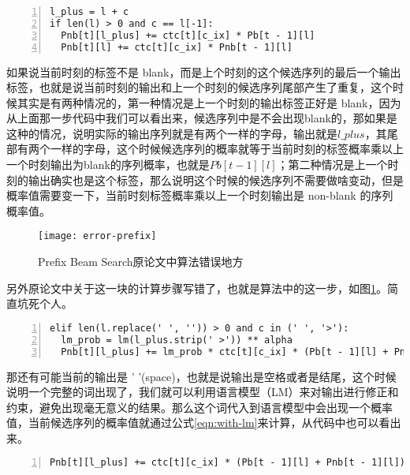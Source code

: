 \begin{lstlisting}[language = shell, numbers=left, 
         numberstyle=\tiny,keywordstyle=\color{blue!70},
         commentstyle=\color{red!50!green!50!blue!50},frame=shadowbox,
         rulesepcolor=\color{red!20!green!20!blue!20},basicstyle=\ttfamily]
l_plus = l + c
if len(l) > 0 and c == l[-1]:
  Pnb[t][l_plus] += ctc[t][c_ix] * Pb[t - 1][l]
  Pnb[t][l] += ctc[t][c_ix] * Pnb[t - 1][l]
\end{lstlisting}

如果说当前时刻的标签不是 blank，而是上个时刻的这个候选序列的最后一个输出标签，也就是说当前时刻的输出和上一个时刻的候选序列尾部产生了重复，这个时候其实是有两种情况的，第一种情况是上一个时刻的输出标签正好是 blank，因为从上面那一步代码中我们可以看出来，候选序列中是不会出现blank的，那如果是这种的情况，说明实际的输出序列就是有两个一样的字母，输出就是$l\_plus$，其尾部有两个一样的字母，这个时候候选序列的概率就等于当前时刻的标签概率乘以上一个时刻输出为blank的序列概率，也就是$Pb[t - 1][l]$；第二种情况是上一个时刻的输出确实也是这个标签，那么说明这个时候的候选序列不需要做啥变动，但是概率值需要变一下，当前时刻标签概率乘以上一个时刻输出是 non-blank 的序列概率值。

\begin{figure}[h]
  \centering
  \texttt{[image: error-prefix]}
  \caption{Prefix Beam Search原论文中算法错误地方 \label{fig:error-prefix}}
\end{figure}

另外原论文中关于这一块的计算步骤写错了，也就是算法中的这一步，如图\ref{fig:error-prefix}。简直坑死个人。

\begin{lstlisting}[language = shell, numbers=left, 
         numberstyle=\tiny,keywordstyle=\color{blue!70},
         commentstyle=\color{red!50!green!50!blue!50},frame=shadowbox,
         rulesepcolor=\color{red!20!green!20!blue!20},basicstyle=\ttfamily]
elif len(l.replace(' ', '')) > 0 and c in (' ', '>'):
  lm_prob = lm(l_plus.strip(' >')) ** alpha
  Pnb[t][l_plus] += lm_prob * ctc[t][c_ix] * (Pb[t - 1][l] + Pnb[t - 1][l])
\end{lstlisting}

那还有可能当前的输出是 ' '(space)，也就是说输出是空格或者是结尾，这个时候说明一个完整的词出现了，我们就可以利用语言模型（LM）来对输出进行修正和约束，避免出现毫无意义的结果。那么这个词代入到语言模型中会出现一个概率值，当前候选序列的概率值就通过公式\ref{eqn:with-lm}来计算，从代码中也可以看出来。

\begin{lstlisting}[language = shell, numbers=left, 
         numberstyle=\tiny,keywordstyle=\color{blue!70},
         commentstyle=\color{red!50!green!50!blue!50},frame=shadowbox,
         rulesepcolor=\color{red!20!green!20!blue!20},basicstyle=\ttfamily]
Pnb[t][l_plus] += ctc[t][c_ix] * (Pb[t - 1][l] + Pnb[t - 1][l])
\end{lstlisting}

